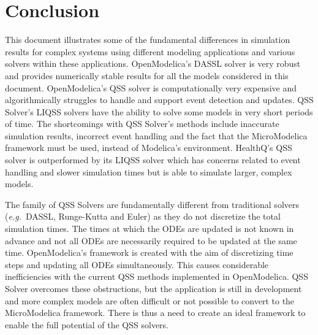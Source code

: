 \documentclass[10pt]{article}
\begin{document}
\newpage

\section{Conclusion}

This document illustrates some of the fundamental differences in simulation results for complex systems using different modeling applications and various solvers within these applications. OpenModelica's DASSL solver is very robust and provides numerically stable results for all the models considered in this document. OpenModelica's QSS solver is computationally very expensive and algorithmically struggles to handle and support event detection and updates. QSS Solver's LIQSS solvers have the ability to solve some models in very short periods of time. The shortcomings with QSS Solver's methods include inaccurate simulation results, incorrect event handling and the fact that the MicroModelica framework must be used, instead of Modelica's environment. HealthQ's QSS solver is outperformed by its LIQSS solver which has concerns related to event handling and slower simulation times but is able to simulate larger, complex models.

The family of QSS Solvers are fundamentally different from traditional solvers ({\em e.g.}\ DASSL, Runge-Kutta and Euler) as they do not discretize the total simulation times. The times at which the ODEs are updated is not known in advance and not all ODEs are necessarily required to be updated at the same time. OpenModelica's framework is created with the aim of discretizing time steps and updating all ODEs simultaneously. This causes considerable inefficiencies with the current QSS methods implemented in OpenModelica. QSS Solver overcomes these obstructions, but the application is still in development and more complex models are often difficult or not possible to convert to the MicroModelica framework. There is thus a need to create an ideal framework to enable the full potential of the QSS solvers.
\end{document}
